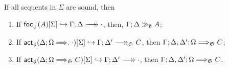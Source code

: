 \begin{lemma}\label{fsoundnesslemma}
  If all sequents in $\Sigma$ are sound, then

  \begin{enumerate}
  \item If $\relj{\frfrel{A}}{\Sigma}{\zfneuseqempty{\Gamma}{\Delta}}$,
    then, $\Gamma; \Delta \gg_{\emptyset} A$;
  \item If
    $\relj{\factrel{\zsyseq{\Delta}{\Omega}{\cdot}{\cdot}}}{\Sigma}
    {\zfneuseq{\Gamma}{\Delta'}{\ctrlset{}}{C}}$, then
    $\Gamma; \Delta, \Delta'; \Omega \Longrightarrow_{\mathfrak{S}_{}} C$;
  \item If
    $\relj{\factrel{\zsyseq{\Delta}{\Omega}{\ctrlset{}}{C}}}{\Sigma}
    {\zfneuseqempty{\Gamma}{\Delta'}}$, then
    $\Gamma; \Delta, \Delta'; \Omega \Longrightarrow_{\mathfrak{S}_{}} C$.
  \end{enumerate}
\end{lemma}
